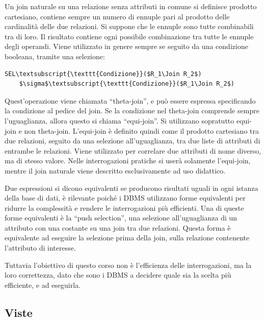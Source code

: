 \documentclass{article}
\numberwithin{equation}{subsection}
\begin{document}
Un join naturale su una relazione senza attributi in comune si definisce prodotto cartesiano, contiene sempre un numero di ennuple pari al prodotto delle cardinalità delle due relazioni. Si suppone che le ennuple 
sono tutte combinabili tra di loro. Il risultato contiene ogni possibile combinazione tra tutte le ennuple degli operandi. 
Viene utilizzato in genere sempre se seguito da una condizione booleana, tramite una selezione:
\begin{Verbatim}[commandchars=\\\{\}, codes={\catcode`$=3\catcode`_=8}]
    SEL\textsubscript{\texttt{Condizione}}($R_1\Join R_2$)
    $\sigma$\textsubscript{\texttt{Condizione}}($R_1\Join R_2$)
\end{Verbatim}
Quest'operazione viene chiamata ``theta-join'', e può essere espressa specificando la condizione al pedice del join. Se la condizione nel theta-join comprende sempre l'uguaglianza, allora questo si chiama 
``equi-join''. Si utilizzano sopratutto equi-join e non theta-join. L'equi-join è definito quindi come il prodotto cartesiano tra due relazioni, seguito da una selezione all'uguaglianza, tra due liste di attributi 
di entrambe le relazioni. Viene utilizzato per correlare due attributi di nome diverso, ma di stesso valore. 
Nelle interrogazioni pratiche si userà solamente l'equi-join, mentre il join naturale viene descritto esclusivamente ad uso didattico. 

Due espressioni si dicono equivalenti se producono risultati uguali in ogni istanza della base di dati, è rilevante poiché i DBMS utilizzano forme equivalenti per ridurre la complessità e rendere le interrogazioni 
più efficienti. 
Una di queste forme equivalenti è la ``push selection'', una selezione all'uguaglianza di un attributo con una costante su una join tra due relazioni. Questa forma è equivalente ad eseguire la selezione prima della 
join, sulla relazione contenente l'attributo di interesse. 

Tuttavia l'obiettivo di questo corso non è l'efficienza delle interrogazioni, ma la loro correttezza, dato che sono i DBMS a decidere quale sia la scelta più efficiente, e ad eseguirla. 

\subsection{Viste}
\end{document}
